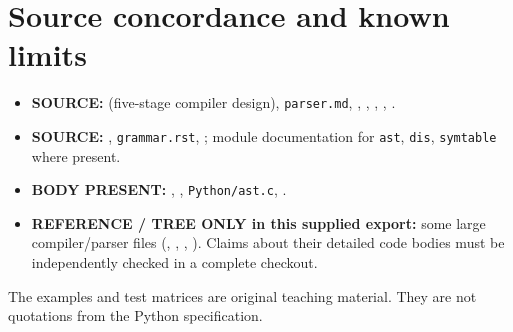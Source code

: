 \documentclass[
  11pt,
]{report}
\newcommand{\passthrough}[1]{#1}
\providecommand{\tightlist}{%
  \setlength{\itemsep}{0pt}\setlength{\parskip}{0pt}}
\begin{document}
\chapter{Source concordance and known
limits}\label{source-concordance-and-known-limits}

\begin{itemize}
\tightlist
\item
  \textbf{SOURCE:} 
  (five-stage compiler design), \passthrough{\lstinline!parser.md!},
  ,
  ,
  ,
  ,
  .
\item
  \textbf{SOURCE:}
  ,
  \passthrough{\lstinline!grammar.rst!},
  ; module documentation for
  \passthrough{\lstinline!ast!}, \passthrough{\lstinline!dis!},
  \passthrough{\lstinline!symtable!} where present.
\item
  \textbf{BODY PRESENT:} ,
  ,
  \passthrough{\lstinline!Python/ast.c!},
  .
\item
  \textbf{REFERENCE / TREE ONLY in this supplied export:} some large
  compiler/parser files (,
  ,
  ,
  ). Claims about their
  detailed code bodies must be independently checked in a complete
  checkout.
\end{itemize}

The examples and test matrices are original teaching material. They are
not quotations from the Python specification.
\end{document}
